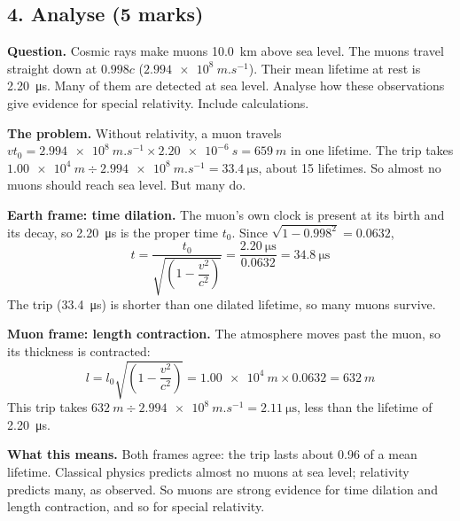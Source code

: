 \subsection*{4. Analyse (5 marks)}
\textbf{Question.} Cosmic rays make muons \qty{10.0}{km} above sea level. The muons travel
straight down at $0.998c$ ($\qty{2.994e8}{m.s^{-1}}$). Their mean lifetime at rest is
\qty{2.20}{\micro\second}. Many of them are detected at sea level. Analyse how these
observations give evidence for special relativity. Include calculations.

\begin{modelanswer}
\textbf{The problem.} Without relativity, a muon travels
$vt_0 = \qty{2.994e8}{m.s^{-1}} \times \qty{2.20e-6}{s} = \qty{659}{m}$ in one lifetime. The
trip takes $\qty{1.00e4}{m} \div \qty{2.994e8}{m.s^{-1}} = \qty{33.4}{\micro\second}$, about
15 lifetimes. So almost no muons should reach sea level. But many do.

\textbf{Earth frame: time dilation.} The muon's own clock is present at its birth and its
decay, so \qty{2.20}{\micro\second} is the proper time $t_0$. Since
$\sqrt{1 - 0.998^2} = 0.0632$,
\[ t = \frac{t_0}{\sqrt{\left(1 - \dfrac{v^2}{c^2}\right)}} = \frac{\qty{2.20}{\micro\second}}{0.0632}
   = \qty{34.8}{\micro\second} \]
The trip (\qty{33.4}{\micro\second}) is shorter than one dilated lifetime, so many muons
survive.

\textbf{Muon frame: length contraction.} The atmosphere moves past the muon, so its thickness
is contracted:
\[ l = l_0\sqrt{\left(1 - \dfrac{v^2}{c^2}\right)} = \qty{1.00e4}{m} \times 0.0632 = \qty{632}{m} \]
This trip takes $\qty{632}{m} \div \qty{2.994e8}{m.s^{-1}} = \qty{2.11}{\micro\second}$, less
than the lifetime of \qty{2.20}{\micro\second}.

\textbf{What this means.} Both frames agree: the trip lasts about 0.96 of a mean lifetime.
Classical physics predicts almost no muons at sea level; relativity predicts many, as
observed. So muons are strong evidence for time dilation and length contraction, and so for
special relativity.
\end{modelanswer}
\begin{markingcriteria}
\end{markingcriteria}

